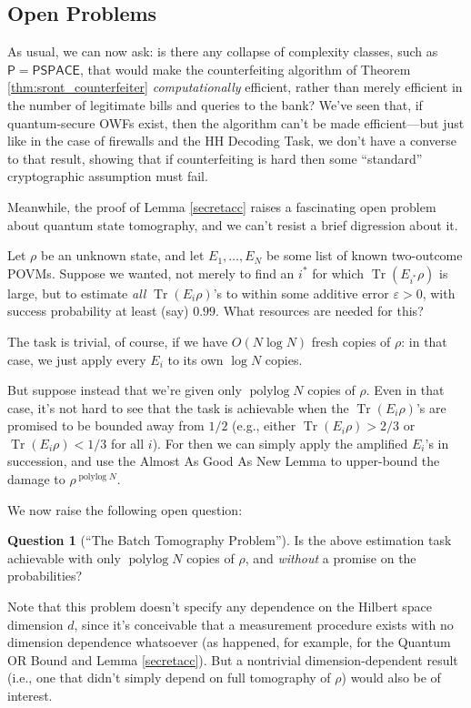 \documentclass[11pt]{report}
\theoremstyle{plain}
\theoremstyle{definition}
\newtheorem{question}[theorem]{Question}
\newcommand{\eps}{\varepsilon}
\newcommand{\Tr}{\operatorname{Tr}}
\begin{document}
\subsection{Open Problems}

As usual, we can now ask: is there any collapse of complexity classes, such as $\mathsf{P}=\mathsf{PSPACE}$, that would make the counterfeiting algorithm of Theorem \ref{thm:sront_counterfeiter} {\em computationally} efficient, rather than merely efficient in the number of legitimate bills and queries to the bank?  We've seen that, if quantum-secure OWFs exist, then the algorithm can't be made efficient---but just like in the case of firewalls and the HH Decoding Task, we don't have a converse to that result, showing that if counterfeiting is hard then some ``standard'' cryptographic assumption must fail.

Meanwhile, the proof of Lemma \ref{secretacc} raises a fascinating open problem about quantum state tomography, and we can't resist a brief digression about it.

Let $\rho$ be an unknown state, and let $E_1,\ldots,E_N$ be some list of known two-outcome POVMs.  Suppose we wanted, not merely to find an $i^{*}$ for which $\Tr(E_{i^{*}} \rho)$ is large, but to estimate {\em all} $\Tr(E_i\rho)$'s to within some additive error $\eps > 0$, with success probability at least (say) $0.99$.  What resources are needed for this?

The task is trivial, of course, if we have $O(N \log N)$ fresh copies of $\rho$: in that case, we just apply every $E_i$ to its own $\log N$ copies.

But suppose instead that we're given only $\operatorname*{polylog} N$ copies of $\rho$.  Even in that case, it's not hard to see that the task is achievable when the $\Tr(E_i\rho)$'s are promised to be bounded away from $1/2$ (e.g., either $\Tr(E_i\rho)>2/3$ or $\Tr(E_i\rho)<1/3$ for all $i$).  For then we can simply apply the amplified $E_i$'s in succession, and use the Almost As Good As New Lemma to upper-bound the damage to $\rho^{\operatorname*{polylog} N}$.

We now raise the following open question:

\begin{question}[``The Batch Tomography Problem'']
Is the above estimation task achievable with only $\operatorname*{polylog} N$ copies of $\rho$, and {\em without} a promise on the probabilities?
\end{question}

Note that this problem doesn't specify any dependence on the Hilbert space dimension $d$, since it's conceivable that a measurement procedure exists with no dimension dependence whatsoever (as happened, for example, for the Quantum OR Bound and Lemma \ref{secretacc}).  But a nontrivial dimension-dependent result (i.e., one that didn't simply depend on full tomography of $\rho$) would also be of interest.
\end{document}
